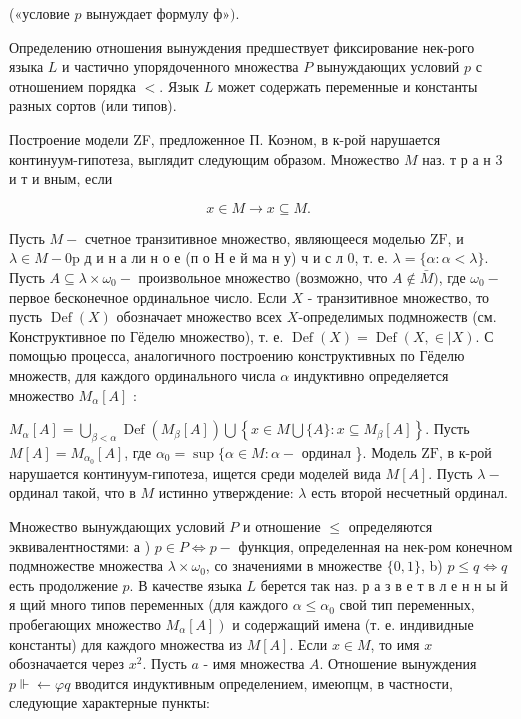 \documentclass[10pt]{article}
\begin{document}
(«условие $p$ вынуждает формулу $ф »)$.



Определению отношения вынуждения предшествует фиксирование нек-рого языка $L$ и частично упорядоченного множества $P$ вынуждающих условий $p$ с отношением порядка $<$. Язык $L$ может содержать переменные и константы разных сортов (или типов).



Построение модели ZF, предложенное П. Коэном, в к-рой нарушается континуум-гипотеза, выглядит следующим образом. Множество $M$ наз. т р а н 3 и т и вным, если



\[

x \in M \longrightarrow x \subseteq M \text {. }

\]



Пусть $M-$ счетное транзитивное множество, являющееся моделью $\mathrm{ZF}$, и $\lambda \in M-0 \mathrm{p}$ д и н а ли н о е (п $о$ Н е й ма н у) ч и с л 0, т. е. $\lambda=\{\alpha: \alpha<\lambda\}$. Пусть $A \subseteq \lambda \times \omega_{0}-$ произвольное множество (возможно, что $A \notin \bar{M})$, где $\omega_{0}-$ первое бесконечное ординальное число. Если $X$ - транзитивное множество, то пусть $\operatorname{Def}(X)$ обозначает множество всех $X$-определимых подмножеств (см. Конструктивное по Гёделю множество), т. е. $\operatorname{Def}(X)=\operatorname{Def}(X, \in \mid X)$. С помощью процесса, аналогичного построению конструктивных по Гёделю множеств, для каждого ординального числа $\alpha$ индуктивно определяется множество $M_{\alpha}[A]$ :



$M_{\alpha}[A]=\bigcup_{\beta<\alpha} \operatorname{Def}\left(M_{\beta}[A]\right) \bigcup\left\{x \in M \bigcup\{A\}: x \subseteq M_{\beta}[A]\right\}$. Пусть $M[A]=M_{\alpha_{0}}[A]$, где $\alpha_{0}=\sup \{\alpha \in M: \alpha-$ ординал \}. Модель $\mathrm{ZF}$, в к-рой нарушается континуум-гипотеза, ищется среди моделей вида $M[A]$. Пусть $\lambda-$ ординал такой, что в $M$ истинно утверждение: $\lambda$ есть второй несчетный ординал.



Множество вынуждающих условий $P$ и отношение $\leqslant$ определяются эквивалентностями: а ) $p \in P \Longleftrightarrow p-$ функция, определенная на нек-ром конечном подмножестве множества $\lambda \times \omega_{0}$, со значениями в множестве $\{0,1\}$, b) $p \leqslant q \Longleftrightarrow q$ есть продолжение $p$. В качестве языка $L$ берется так наз. р а з в е т в л е н н ы й я щий много типов переменных (для каждого $\alpha \leqslant \alpha_{0}$ свой тип переменных, пробегающих множество $\left.M_{\alpha}[A]\right)$ и содержащий имена (т. е. индивидные константы) для каждого множества из $M[A]$. Если $x \in M$, то имя $x$ обозначается через $x^{2}$. Пусть $a$ - имя множества $A$. Отношение вынуждения $p \Vdash \leftarrow \varphi q$ вводится индуктивным определением, имеюпцм, в частности, следующие характерные пункты:
\end{document}
